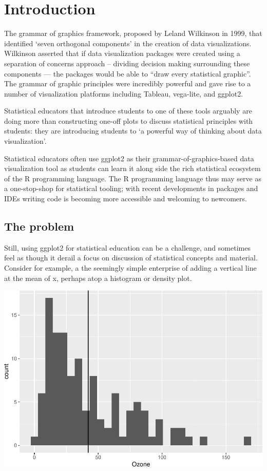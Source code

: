 \documentclass[12pt]{article}
\begin{document}
\hypertarget{introduction}{%
\section{Introduction}\label{introduction}}

The grammar of graphics framework, proposed by Leland Wilkinson in 1999,
that identified `seven orthogonal components' in the creation of data
visualizations.\\
Wilkinson asserted that if data visualization packages were created
using a separation of concerns approach -- dividing decision making
surrounding these components --- the packages would be able to ``draw
every statistical graphic''. The grammar of graphic principles were
incredibly powerful and gave rise to a number of visualization platforms
including Tableau, vega-lite, and ggplot2.

Statistical educators that introduce students to one of these tools
arguably are doing more than constructing one-off plots to discuss
statistical principles with students: they are introducing students to
`a powerful way of thinking about data visualization'.

Statistical educators often use ggplot2 as their
grammar-of-graphics-based data visualization tool as students can learn
it along side the rich statistical ecosystem of the R programming
language. The R programming language thus may serve as a one-stop-shop
for statistical tooling; with recent developments in packages and IDEs
writing code is becoming more accessible and welcoming to newcomers.

\hypertarget{the-problem}{%
\subsection{The problem}\label{the-problem}}

Still, using ggplot2 for statistical education can be a challenge, and
sometimes feel as though it derail a focus on discussion of statistical
concepts and material.\\
Consider for example, a the seemingly simple enterprise of adding a
vertical line at the mean of x, perhaps atop a histogram or density
plot.

\begin{center}\includegraphics[width=0.5\linewidth]{skeleton_files/figure-latex/unnamed-chunk-2-1} \end{center}
\end{document}

